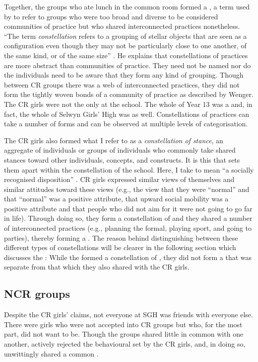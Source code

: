 Together, the groups who ate lunch in the common room formed a , a term used by \citet{wenger1998} to refer to groups who were too broad and diverse to be considered communities of practice but who shared interconnected practices nonetheless. ``The term \textit{constellation} refers to a grouping of stellar objects that are seen as a configuration even though they may not be particularly close to one another, of the same kind, or of the same size'' \citep[127]{wenger1998}. He explains that constellations of practices are more abstract than communities of practice.  They need not be named nor do the individuals need to be aware that they form any kind of grouping. Though between CR groups there was a web of interconnected practices, they did not form the tightly woven bonds of a community of practice as described by Wenger. The CR girls were not the only  at the school. The whole of Year 13 was a  and, in fact, the whole of Selwyn Girls' High was as well. Constellations of practices can take a number of forms and can be observed at multiple levels of categorisation.

The CR girls also formed what I refer to as a \textit{constellation of stance}, an aggregate of individuals or groups of individuals who commonly take shared stances toward other individuals, concepts, and constructs. It is this that sets them apart within the constellation of the school. Here, I take  to mean ``a socially recognised disposition'' \citep[2]{ochs1990}. CR girls expressed similar views of themselves and similar attitudes toward these views (e.g., the view that they were ``normal'' and that ``normal'' was a positive attribute, that upward social mobility was a positive attribute and that people who did not aim for it were not going to go far in life). Through doing so, they form a constellation of  and they shared a number of interconnected practices (e.g., planning the formal, playing sport, and going to parties), thereby forming a . The reason behind distinguishing between these different types of constellations will be clearer in the following section which discusses the : While the  formed a constellation of , they did not form a  that was separate from that which they also shared with the CR girls.

  

\subsection{NCR groups}
\largerpage[-1]
Despite the CR girls' claims, not everyone at SGH was friends with everyone else. There were girls who were not accepted into CR groups but who, for the most part, did not want to be. Though the groups shared little in common with one another,  actively rejected the behavioural  set by the CR girls, and, in doing so, unwittingly shared a common . 
 

